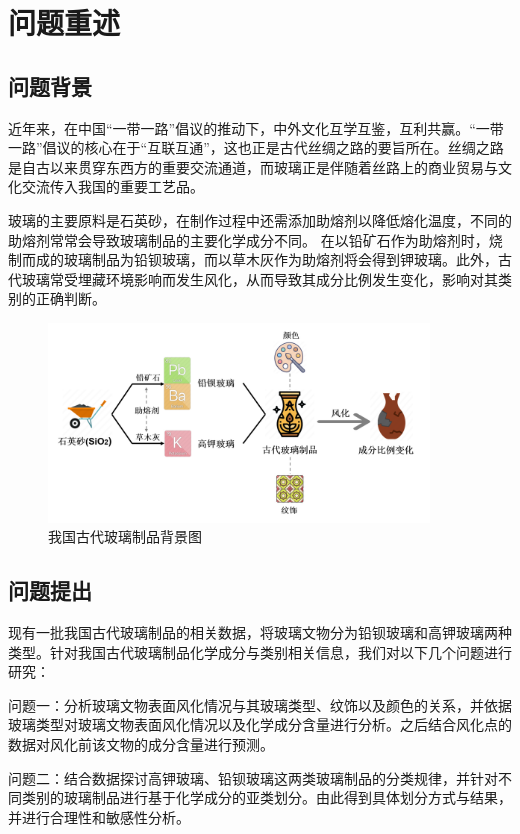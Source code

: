 \documentclass[withoutpreface,bwprint]{cumcmthesis} %
\begin{document}
\section{问题重述}

\subsection{问题背景}

近年来，在中国“一带一路”倡议的推动下，中外文化互学互鉴，互利共赢。“一带一路”倡议的核心在于“互联互通”，这也正是古代丝绸之路的要旨所在。丝绸之路是自古以来贯穿东西方的重要交流通道，而玻璃正是伴随着丝路上的商业贸易与文化交流传入我国的重要工艺品。

玻璃的主要原料是石英砂，在制作过程中还需添加助熔剂以降低熔化温度，不同的助熔剂常常会导致玻璃制品的主要化学成分不同。
在以铅矿石作为助熔剂时，烧制而成的玻璃制品为铅钡玻璃，而以草木灰作为助熔剂将会得到钾玻璃。此外，古代玻璃常受埋藏环境影响而发生风化，从而导致其成分比例发生变化，影响对其类别的正确判断。

\begin{figure}[H]
\centering
\includegraphics[width=0.9\textwidth]{figure/背景}
\caption{我国古代玻璃制品背景图}
\end{figure}

\subsection{问题提出}

现有一批我国古代玻璃制品的相关数据，将玻璃文物分为铅钡玻璃和高钾玻璃两种类型。针对我国古代玻璃制品化学成分与类别相关信息，我们对以下几个问题进行研究：

问题一：分析玻璃文物表面风化情况与其玻璃类型、纹饰以及颜色的关系，并依据玻璃类型对玻璃文物表面风化情况以及化学成分含量进行分析。之后结合风化点的数据对风化前该文物的成分含量进行预测。

问题二：结合数据探讨高钾玻璃、铅钡玻璃这两类玻璃制品的分类规律，并针对不同类别的玻璃制品进行基于化学成分的亚类划分。由此得到具体划分方式与结果，并进行合理性和敏感性分析。
\end{document}
